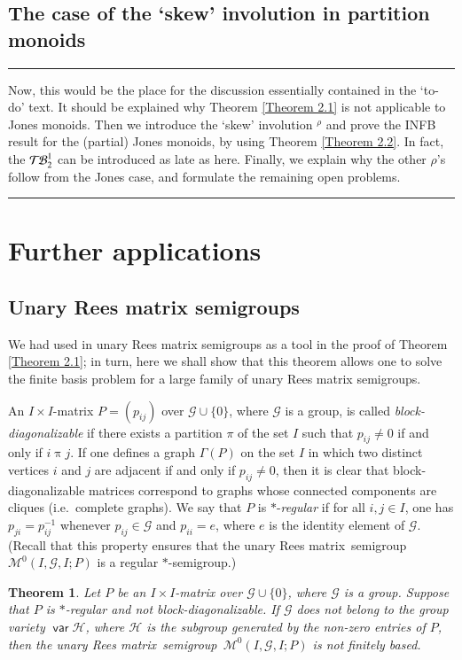 \documentclass[preprint,1p,times]{elsarticle}
\DeclareMathOperator{\var}{\mathsf{var}}
\numberwithin{equation}{section}
\newtheorem{Thm}{Theorem}[section]
\theoremstyle{remark}
\def\cal{\mathcal}
\def\Mc{{\cal M}}
\def\m{\mathrel}
\def\Rm{Rees matrix}
\def\sm{semi\-group}
\def\TB{\ensuremath{\mathcal{T\kern-1pt B}_2^1}}
\begin{document}
\subsection{The case of the `skew' involution in partition monoids}

\smallskip\hrule

\medskip

\textsf{Now, this would be the place for the discussion essentially contained in the `to-do' text. It should be
explained why Theorem \ref{Theorem 2.1} is not applicable to Jones monoids. Then we introduce the `skew' involution
${}^\rho$ and prove the INFB result for the (partial) Jones monoids, by using Theorem \ref{Theorem 2.2}. In fact, the
$\TB$ can be introduced as late as here. Finally, we explain why the other $\rho$'s follow from the Jones case, and
formulate the remaining open problems.}

\medskip

\hrule\smallskip

\section{Further applications}
\subsection{Unary Rees matrix semigroups}
We had used in \cite{adv} unary Rees matrix semigroups as a tool in the proof of Theorem \ref{Theorem 2.1}; in turn,
here we shall show that this theorem allows one to solve the finite basis problem for a large family of unary Rees
matrix semigroups.

An $I\times I$-matrix $P=(p_{ij})$ over $\mathcal{G}\cup\{0\}$, where $\mathcal{G}$ is a group, is called
\emph{block-diagonalizable} if there exists a partition $\pi$ of the set $I$ such that $p_{ij}\ne 0$ if and only if
$i\m{\pi}j$. If one defines a graph $\Gamma(P)$ on the set $I$ in which two distinct vertices $i$ and $j$ are adjacent
if and only if $p_{ij}\ne0$, then it is clear that block-diagonalizable matrices correspond to graphs whose connected
components are cliques (i.e.\ complete graphs). We say that $P$ is $*$-\emph{regular} if for all $i,j\in I$, one has
$p_{ji}=p_{ij}^{-1}$ whenever $p_{ij}\in \mathcal{G}$ and $p_{ii}=e$, where $e$ is the identity element of
$\mathcal{G}$. (Recall that this property ensures that the unary \Rm\ \sm\ $\Mc^0(I,\mathcal{G},I;P)$ is a regular
$*$-semigroup.)

\begin{Thm}
\label{Rees matrix} Let $P$ be an $I\times I$-matrix over $\mathcal{G}\cup\{0\}$, where $\mathcal{G}$ is a group.
Suppose that $P$ is $*$-regular and not block-diagonalizable. If $\mathcal{G}$ does not belong to the group variety
$\var\mathcal{H}$, where $\mathcal{H}$ is the subgroup generated by the non-zero entries of $P$, then the unary \Rm\
\sm\ $\Mc^0(I,\mathcal{G},I;P)$ is not finitely based.
\end{Thm}
\end{document}
